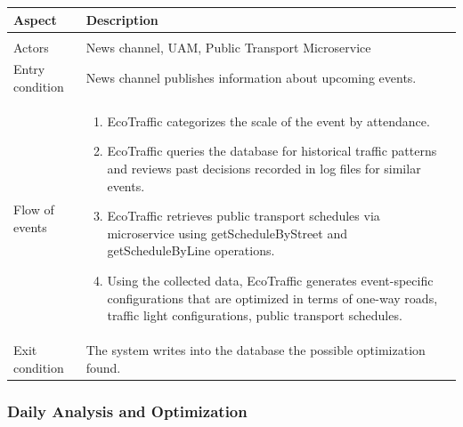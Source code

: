 \documentclass[12pt, a4paper, twoside, openright]{report}
\begin{document}
\begin{longtable}{>{\raggedright\arraybackslash}p{} >{\raggedright\arraybackslash}p{}}
\toprule
\textbf{Aspect} & \textbf{Description} \\
\midrule
\endhead
\midrule
\multicolumn{2}{r}{\textit{Continues on next page}} \\
\endfoot
\bottomrule
\endlastfoot

Actors & News channel, UAM, Public Transport Microservice \\
Entry condition & News channel publishes information about upcoming events. \\
Flow of events &
\begin{enumerate}
  \item EcoTraffic categorizes the scale of the event by attendance.
  \item EcoTraffic queries the database for historical traffic patterns and reviews past decisions recorded in log files for similar events.
  \item EcoTraffic retrieves public transport schedules via microservice using getScheduleByStreet and getScheduleByLine operations.
  \item Using the collected data, EcoTraffic generates event-specific configurations that are optimized in terms of one-way roads, traffic light configurations, public transport schedules.
\end{enumerate}
\\
Exit condition & The system writes into the database the possible optimization found. \\
\end{longtable}


\subsubsection{Daily Analysis and Optimization}
\end{document}
